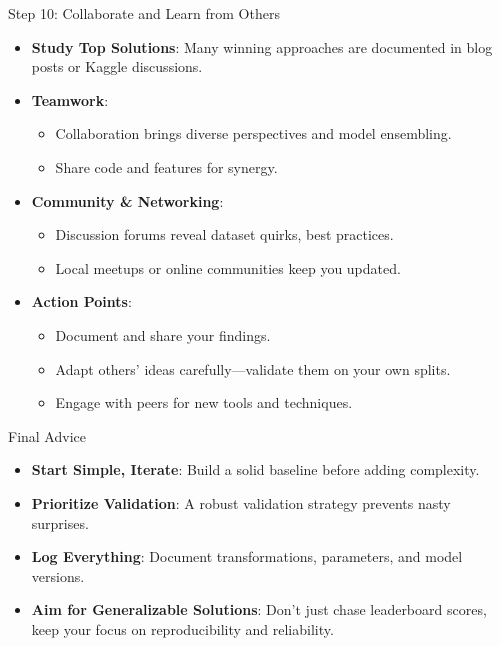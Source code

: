 \documentclass[10pt,compress,t,notes=noshow, xcolor=table]{beamer}
\begin{document}
\begin{frame}{Step 10: Collaborate and Learn from Others}
\begin{itemize}
  \item \textbf{Study Top Solutions}: Many winning approaches are documented in blog posts or Kaggle discussions.
  \item \textbf{Teamwork}:
    \begin{itemize}
      \item Collaboration brings diverse perspectives and model ensembling.
      \item Share code and features for synergy.
    \end{itemize}
  \item \textbf{Community \& Networking}:
    \begin{itemize}
      \item Discussion forums reveal dataset quirks, best practices.
      \item Local meetups or online communities keep you updated.
    \end{itemize}
  \item \textbf{Action Points}:
    \begin{itemize}
      \item Document and share your findings.
      \item Adapt others' ideas carefully—validate them on your own splits.
      \item Engage with peers for new tools and techniques.
    \end{itemize}
\end{itemize}
\end{frame}

\begin{frame}{Final Advice}
\begin{itemize}
  \item \textbf{Start Simple, Iterate}: Build a solid baseline before adding complexity.
  \item \textbf{Prioritize Validation}: A robust validation strategy prevents nasty surprises.
  \item \textbf{Log Everything}: Document transformations, parameters, and model versions.
  \item \textbf{Aim for Generalizable Solutions}: Don't just chase leaderboard scores, keep your focus on reproducibility and reliability.
\end{itemize}
\end{frame}

\endlecture
\end{document}
